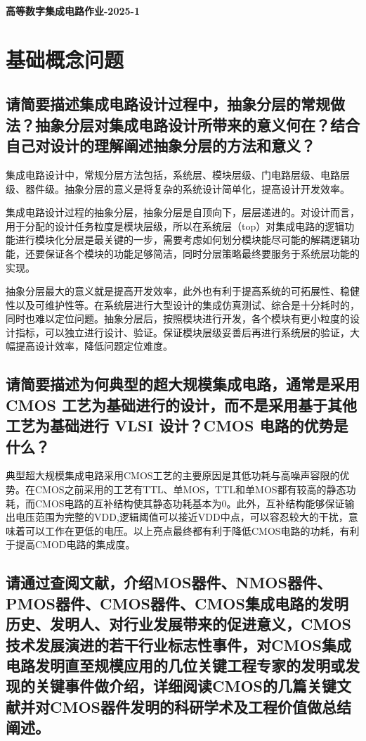 \documentclass[12pt,a4paper]{ctexart}
\begin{document}
\begin{center}
    \LARGE \textbf{高等数字集成电路作业-2025-1}
\end{center}

\section{基础概念问题}

\subsection{请简要描述集成电路设计过程中，抽象分层的常规做法？抽象分层对集成电路设计所带来的意义何在？结合自己对设计的理解阐述抽象分层的方法和意义？}

集成电路设计中，常规分层方法包括，系统层、模块层级、门电路层级、电路层级、器件级。抽象分层的意义是将复杂的系统设计简单化，提高设计开发效率。

集成电路设计过程的抽象分层，抽象分层是自顶向下，层层递进的。对设计而言，用于分配的设计任务粒度是模块层级，所以在系统层（top）对集成电路的逻辑功能进行模块化分层是最关键的一步，需要考虑如何划分模块能尽可能的解耦逻辑功能，还要保证各个模块的功能足够简洁，同时分层策略最终要服务于系统层功能的实现。

抽象分层最大的意义就是提高开发效率，此外也有利于提高系统的可拓展性、稳健性以及可维护性等。在系统层进行大型设计的集成仿真测试、综合是十分耗时的，同时也难以定位问题。抽象分层后，按照模块进行开发，各个模块有更小粒度的设计指标，可以独立进行设计、验证。保证模块层级妥善后再进行系统层的验证，大幅提高设计效率，降低问题定位难度。


\subsection{请简要描述为何典型的超大规模集成电路，通常是采用 CMOS 工艺为基础进行的设计，而不是采用基于其他工艺为基础进行 VLSI 设计？CMOS 电路的优势是什么？}

典型超大规模集成电路采用CMOS工艺的主要原因是其低功耗与高噪声容限的优势。在CMOS之前采用的工艺有TTL、单MOS，TTL和单MOS都有较高的静态功耗，而CMOS电路的互补结构使其静态功耗基本为0。此外，互补结构能够保证输出电压范围为完整的VDD,逻辑阈值可以接近VDD中点，可以容忍较大的干扰，意味着可以工作在更低的电压。以上亮点最终都有利于降低CMOS电路的功耗，有利于提高CMOD电路的集成度。

\subsection{请通过查阅文献，介绍MOS器件、NMOS器件、PMOS器件、CMOS器件、CMOS集成电路的发明历史、发明人、对行业发展带来的促进意义，CMOS技术发展演进的若干行业标志性事件，对CMOS集成电路发明直至规模应用的几位关键工程专家的发明或发现的关键事件做介绍，详细阅读CMOS的几篇关键文献并对CMOS器件发明的科研学术及工程价值做总结阐述。}
\end{document}
